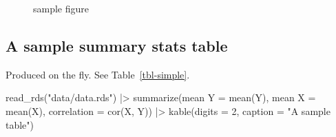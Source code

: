 \documentclass[
  sn-nature,
]{sn-jnl}
\newenvironment{Shaded}{\begin{snugshade}}{\end{snugshade}}
\newcommand{\AttributeTok}[1]{\textcolor[rgb]{0.40,0.45,0.13}{#1}}
\newcommand{\DecValTok}[1]{\textcolor[rgb]{0.68,0.00,0.00}{#1}}
\newcommand{\FunctionTok}[1]{\textcolor[rgb]{0.28,0.35,0.67}{#1}}
\newcommand{\NormalTok}[1]{\textcolor[rgb]{0.00,0.23,0.31}{#1}}
\newcommand{\OtherTok}[1]{\textcolor[rgb]{0.00,0.23,0.31}{#1}}
\newcommand{\SpecialCharTok}[1]{\textcolor[rgb]{0.37,0.37,0.37}{#1}}
\newcommand{\StringTok}[1]{\textcolor[rgb]{0.13,0.47,0.30}{#1}}
\begin{document}
\begin{figure}[H]


\caption{\label{fig-1}sample figure}

\end{figure}%

\newpage

\subsection{A sample summary stats
table}\label{a-sample-summary-stats-table}

Produced on the fly. See Table~\ref{tbl-simple}.

\begin{Shaded}
\begin{Highlighting}[]
\FunctionTok{read\_rds}\NormalTok{(}\StringTok{"data/data.rds"}\NormalTok{) }\SpecialCharTok{|\textgreater{}}
  \FunctionTok{summarize}\NormalTok{(}\StringTok{\textasciigrave{}}\AttributeTok{mean Y}\StringTok{\textasciigrave{}} \OtherTok{=} \FunctionTok{mean}\NormalTok{(Y), }
            \StringTok{\textasciigrave{}}\AttributeTok{mean X}\StringTok{\textasciigrave{}} \OtherTok{=} \FunctionTok{mean}\NormalTok{(X), }
            \AttributeTok{correlation =} \FunctionTok{cor}\NormalTok{(X, Y)) }\SpecialCharTok{|\textgreater{}}
  \FunctionTok{kable}\NormalTok{(}\AttributeTok{digits =} \DecValTok{2}\NormalTok{, }\AttributeTok{caption =} \StringTok{"A sample table"}\NormalTok{)}
\end{Highlighting}
\end{Shaded}
\end{document}
